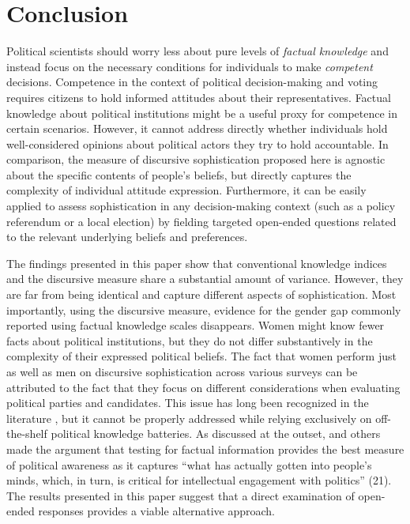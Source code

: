 \section{Conclusion}

Political scientists should worry less about pure levels of \textit{factual knowledge} and instead focus on the necessary conditions for individuals to make \textit{competent} decisions. Competence in the context of political decision-making and voting requires citizens to hold informed attitudes about their representatives. Factual knowledge about political institutions might be a useful proxy for competence in certain scenarios. However, it cannot address directly whether individuals hold well-considered opinions about political actors they try to hold accountable. In comparison, the measure of discursive sophistication proposed here is agnostic about the specific contents of people's beliefs, but directly captures the complexity of individual attitude expression. Furthermore, it can be easily applied to assess sophistication in any decision-making context (such as a policy referendum or a local election) by fielding targeted open-ended questions related to the relevant underlying beliefs and preferences.

The findings presented in this paper show that conventional knowledge indices and the discursive measure share a substantial amount of variance. However, they are far from being identical and capture different aspects of sophistication. Most importantly, using the discursive measure, evidence for the gender gap commonly reported using factual knowledge scales disappears. Women might know fewer facts about political institutions, but they do not differ substantively in the complexity of their expressed political beliefs. The fact that women perform just as well as men on discursive sophistication across various surveys can be attributed to the fact that they focus on different considerations when evaluating political parties and candidates. This issue has long been recognized in the literature \citep[e.g.,][]{graber2001processing,dolan2011women}, but it cannot be properly addressed while relying exclusively on off-the-shelf political knowledge batteries. As discussed at the outset, \citet{zaller1992nature} and others made the argument that testing for factual information provides the best measure of political awareness as it captures ``what has actually gotten into people's minds, which, in turn, is critical for intellectual engagement with politics'' (21). The results presented in this paper suggest that a direct examination of open-ended responses provides a viable alternative approach.

